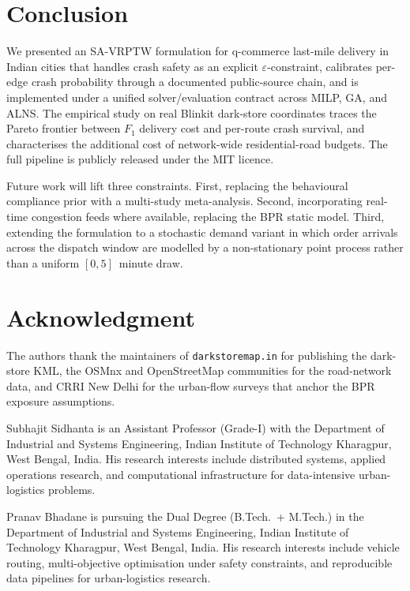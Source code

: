 \documentclass{ieeeaccess}
\begin{document}
\section{Conclusion}
\label{sec:conclusion}

We presented an SA-VRPTW formulation for q-commerce last-mile
delivery in Indian cities that handles crash safety as an explicit
$\varepsilon$-constraint, calibrates per-edge crash probability
through a documented public-source chain, and is implemented under a
unified solver/evaluation contract across MILP, GA, and ALNS. The
empirical study on real Blinkit dark-store coordinates traces the
Pareto frontier between $F_1$ delivery cost and per-route crash
survival, and characterises the additional cost of network-wide
residential-road budgets. The full pipeline is publicly released
under the MIT licence.

Future work will lift three constraints. First, replacing the
behavioural compliance prior with a multi-study meta-analysis. Second,
incorporating real-time congestion feeds where available, replacing
the BPR static model. Third, extending the formulation to a stochastic
demand variant in which order arrivals across the dispatch window are
modelled by a non-stationary point process rather than a uniform
$[0, 5]$~minute draw.

\section*{Acknowledgment}
The authors thank the maintainers of \texttt{darkstoremap.in} for
publishing the dark-store KML, the OSMnx and OpenStreetMap
communities for the road-network data, and CRRI New Delhi for the
urban-flow surveys that anchor the BPR exposure assumptions.




\begin{IEEEbiographynophoto}{Subhajit Sidhanta}
is an Assistant Professor (Grade-I) with the Department of Industrial
and Systems Engineering, Indian Institute of Technology Kharagpur,
West Bengal, India. His research interests include distributed
systems, applied operations research, and computational
infrastructure for data-intensive urban-logistics problems.
\end{IEEEbiographynophoto}

\begin{IEEEbiographynophoto}{Pranav Bhadane}
is pursuing the Dual Degree (B.Tech.\ + M.Tech.) in the Department of
Industrial and Systems Engineering, Indian Institute of Technology
Kharagpur, West Bengal, India. His research interests include vehicle
routing, multi-objective optimisation under safety constraints, and
reproducible data pipelines for urban-logistics research.
\end{IEEEbiographynophoto}

\EOD
\end{document}
